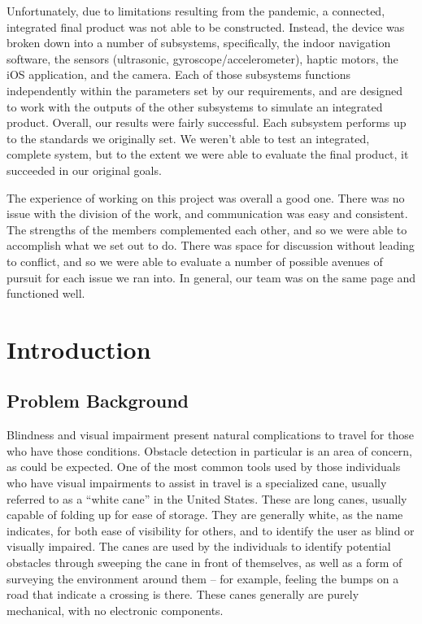 \documentclass[letterpaper,12pt]{article}
\begin{document}
Unfortunately, due to limitations resulting from the pandemic, a connected, integrated final product was not able to be constructed. Instead, the device was broken down into a number of subsystems, specifically, the indoor navigation software, the sensors (ultrasonic, gyroscope/accelerometer), haptic motors, the iOS application, and the camera. Each of those subsystems functions independently within the parameters set by our requirements, and are designed to work with the outputs of the other subsystems to simulate an integrated product. Overall, our results were fairly successful. Each subsystem performs up to the standards we originally set. We weren't able to test an integrated, complete system, but to the extent we were able to evaluate the final product, it succeeded in our original goals. \par

The experience of working on this project was overall a good one. There was no issue with the division of the work, and communication was easy and consistent. The strengths of the members complemented each other, and so we were able to accomplish what we set out to do. There was space for discussion without leading to conflict, and so we were able to evaluate a number of possible avenues of pursuit for each issue we ran into. In general, our team was on the same page and functioned well. \par

\newpage

\section{Introduction}
\subsection{Problem Background}

Blindness and visual impairment present natural complications to travel for those who have those conditions. Obstacle detection in particular is an area of concern, as could be expected. One of the most common tools used by those individuals who have visual impairments to assist in travel is a specialized cane, usually referred to as a “white cane” in the United States. These are long canes, usually capable of folding up for ease of storage. They are generally white, as the name indicates, for both ease of visibility for others, and to identify the user as blind or visually impaired. The canes are used by the individuals to identify potential obstacles through sweeping the cane in front of themselves, as well as a form of surveying the environment around them – for example, feeling the bumps on a road that indicate a crossing is there. These canes generally are purely mechanical, with no electronic components. \par
\end{document}
